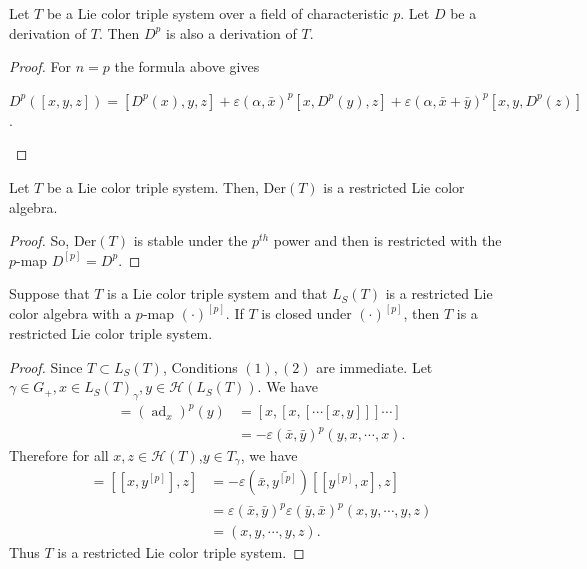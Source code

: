 \documentclass[11pt, twoside]{article}
\DeclareMathOperator{\ad}{ad}
\begin{document}
\begin{cor}
    Let $T$ be a Lie color triple system over a field of characteristic $p$. Let $D$ be a derivation of $T$. Then $D^p$ is also a derivation of $T$.
\end{cor}

\begin{proof}
    For $n=p$ the formula above gives \begin{center}
        $D^p([x,y,z])= [D^p(x),y,z]+\varepsilon(\alpha,\bar{x})^p[x,D^p(y),z]+\varepsilon(\alpha,\bar{x}+\bar{y})^p[x,y,D^p(z)] $.
    \end{center}
\end{proof}

\begin{prop}
    Let $T$ be a Lie color triple system. Then, $\mathrm{Der}(T)$ is a restricted Lie color algebra.
\end{prop}

\begin{proof}
    So, $\mathrm{Der}(T) $ is stable under the $p^{th} $ power and then is restricted with the $p$-map $D^{[p]}=D^p $.
\end{proof}

\begin{thm}\label{thm4.9}
    Suppose that $T$ is a Lie color triple system and that $L_S(T)$ is a restricted Lie color algebra with a $p$-map $(\cdot)^{[p]} $. If $T$ is closed under $(\cdot)^{[p]} $, then $T$ is a restricted Lie color triple system.
\end{thm}

\begin{proof}

    Since $T\subset L_S(T)$, Conditions $(1),(2)$ are immediate. Let $\gamma\in G_+ ,x\in L_S(T)_\gamma, y\in \mathcal{H}(L_S(T))$. We have \begin{align*}
         [x^{[p]},y]=(\ad_x)^p(y)& = [x,[x,[\cdots[x,y]]]\cdots]\\ & = -\varepsilon(\bar{x},\bar{y})^p(y,x,\cdots,x) .\end{align*} Therefore for all $x,z\in \mathcal{H}(T)$,$y\in T_\gamma$, we have \begin{align*}
             [x,y^{[p]},z]=[[x,y^{[p]}],z] &=-\varepsilon(\bar{x},\bar{y^{[p]}})[[y^{[p]},x],z]\\ &=\varepsilon(\bar{x},\bar{y})^p\varepsilon(\bar{y},\bar{x})^p(x,y,\cdots,y,z)\\ &=(x,y,\cdots,y,z) . \end{align*} Thus $T$ is a restricted Lie color triple system.
\end{proof}
\end{document}
